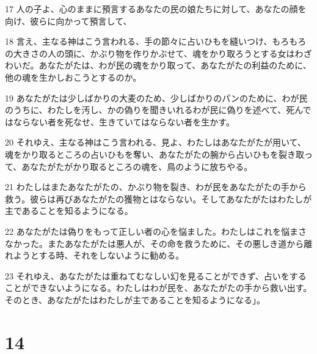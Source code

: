 \par 17 人の子よ、心のままに預言するあなたの民の娘たちに対して、あなたの顔を向け、彼らに向かって預言して、
\par 18 言え、主なる神はこう言われる、手の節々に占いひもを縫いつけ、もろもろの大きさの人の頭に、かぶり物を作りかぶせて、魂をかり取ろうとする女はわざわいだ。あなたがたは、わが民の魂をかり取って、あなたがたの利益のために、他の魂を生かしおこうとするのか。
\par 19 あなたがたは少しばかりの大麦のため、少しばかりのパンのために、わが民のうちに、わたしを汚し、かの偽りを聞きいれるわが民に偽りを述べて、死んではならない者を死なせ、生きていてはならない者を生かす。
\par 20 それゆえ、主なる神はこう言われる、見よ、わたしはあなたがたが用いて、魂をかり取るところの占いひもを奪い、あなたがたの腕から占いひもを裂き取って、あなたがたがかり取るところの魂を、鳥のように放ちやる。
\par 21 わたしはまたあなたがたの、かぶり物を裂き、わが民をあなたがたの手から救う。彼らは再びあなたがたの獲物とはならない。そしてあなたがたはわたしが主であることを知るようになる。
\par 22 あなたがたは偽りをもって正しい者の心を悩ました。わたしはこれを悩まさなかった。またあなたがたは悪人が、その命を救うために、その悪しき道から離れようとする時、それをしないように勧める。
\par 23 それゆえ、あなたがたは重ねてむなしい幻を見ることができず、占いをすることができないようになる。わたしはわが民を、あなたがたの手から救い出す。そのとき、あなたがたはわたしが主であることを知るようになる」。

\chapter{14}

